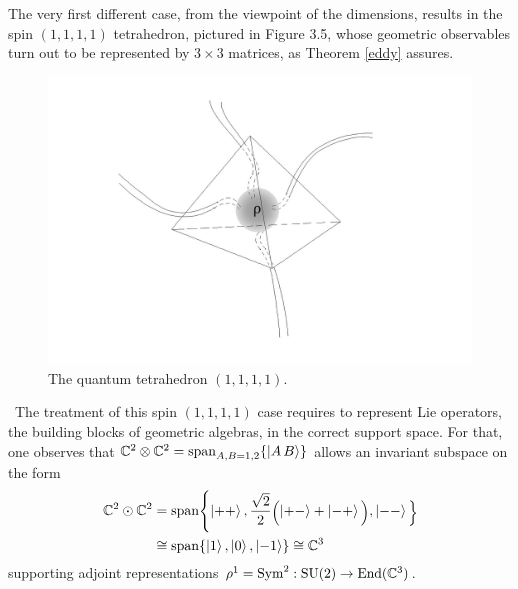 The very first different case, from the viewpoint of the dimensions, results in the spin $(1,1,1,1)$ tetrahedron, pictured in Figure 3.5, whose geometric observables turn out to be represented by $3\times3$ matrices, as Theorem \ref{eddy} assures.
\begin{figure}[ht]
    \centering
    \includegraphics[scale=0.3]{images/1_tetrahedron.jpeg}
    \caption{The quantum tetrahedron $(1,1,1,1)$.}
\end{figure}
\,\newline
The treatment of this spin $(1,1,1,1)$ case requires to represent Lie operators, the building blocks of geometric algebras, in the correct support space. For that, one observes that $\mathbb{C}^2\otimes\mathbb{C}^2=\operatorname{span}_{A,B=1,2}\{\left| A\,B \right >\}$ allows an invariant subspace on the form 
\begin{equation}\label{C3_subspace}
\begin{split}
    \mathbb{C}^2\odot\mathbb{C}^2&=\operatorname{span}\Biggl\{\left| ++ \right >,\tiny{\frac{\sqrt{2}}{2}}\Biggl(\left| +- \right >+\left| -+ \right >\Biggl),\left| -- \right >\Biggl\}\\
    &\cong\operatorname{span}\{\left| 1 \right >,\left| 0 \right >,\left| -1 \right >\}\cong\mathbb{C}^3
\end{split}    
\end{equation}\label{C3_subspace}
supporting adjoint representations $\rho^1=\text{\normalfont Sym}^2:\text{\normalfont SU}(2)\to\text{\normalfont End}(\mathbb{C}^3)$. 

